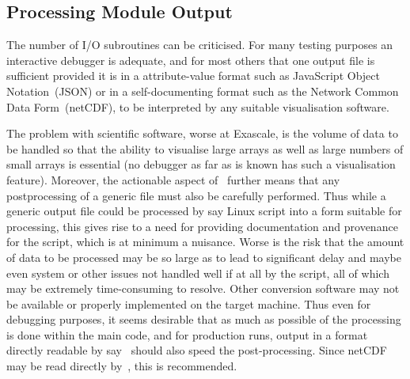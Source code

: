 \subsection{Processing Module Output}\label{sec:TS_procio}
The number of I/O subroutines can be criticised.
For many testing purposes an interactive debugger is adequate,
and for most others that one output file is sufficient provided it is in a attribute-value
format such as JavaScript Object Notation~(JSON) or in a self-documenting format such as the 
Network Common Data Form~(netCDF), to be interpreted by any suitable visualisation software.

The problem with scientific software, worse
at Exascale, is the volume of data to be handled so that the ability to visualise large arrays
as well as large numbers of small arrays is essential (no debugger as far as is known has 
such a visualisation feature).  Moreover, the actionable aspect of \nep\ further means
that any postprocessing of a generic file must also be carefully performed. Thus while
a generic output file could be processed by say Linux  script into a form suitable for
 processing, this gives rise to a need for providing documentation and
provenance for the script, which is at minimum a nuisance. Worse is the risk that the amount of
data to be processed may be so large as to lead to significant
delay and maybe even system or other issues not handled well if at all by the script, all of which
may be extremely time-consuming to resolve. Other conversion software may not be available
or properly implemented on the target machine.
Thus even for debugging purposes, it seems desirable that as much as possible of the processing
is done within the main code, and for production runs, output in a format
directly readable by say~ should also speed the post-processing.
Since netCDF may be read directly by~, this is recommended.


